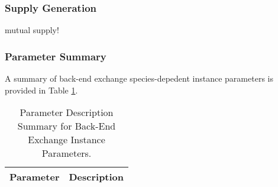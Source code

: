 \subsubsection{Supply Generation}

mutual supply!

\subsubsection{Parameter Summary}

A summary of back-end exchange species-depedent instance parameters is provided
in Table \ref{tbl:back_params}.

\begin{table}[h]
\centering
\caption{Parameter Description Summary for Back-End Exchange Instance
  Parameters.}
\label{tbl:back_params}
\begin{tabularx}{\columnwidth-10pt}{|c|X|} %
\hline
Parameter    & 
Description
\\ \hline
\end{tabularx}
\end{table}
